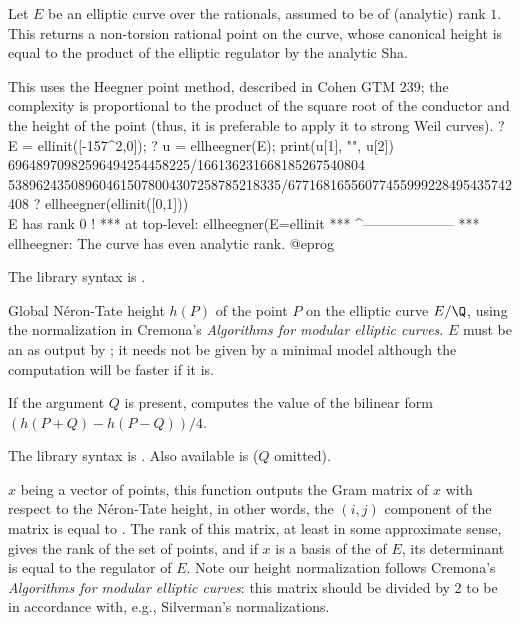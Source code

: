 \label{se:ellheegner}
Let $E$ be an elliptic curve over the rationals, assumed to be of
(analytic) rank $1$. This returns a non-torsion rational point on the curve,
whose canonical height is equal to the product of the elliptic regulator by the
analytic Sha.

This uses the Heegner point method, described in Cohen GTM 239; the complexity
is proportional to the product of the square root of the conductor and the
height of the point (thus, it is preferable to apply it to strong Weil curves).
\bprog
? E = ellinit([-157^2,0]);
? u = ellheegner(E); print(u[1], "\n", u[2])
69648970982596494254458225/166136231668185267540804
538962435089604615078004307258785218335/67716816556077455999228495435742408
? ellheegner(ellinit([0,1]))         \\ E has rank 0 !
 ***   at top-level: ellheegner(E=ellinit
 ***                 ^--------------------
 *** ellheegner: The curve has even analytic rank.
@eprog

The library syntax is .

\label{se:ellheight}
Global N\'eron-Tate height $h(P)$ of the point $P$ on the elliptic curve
$E/\Q$, using the normalization in Cremona's \emph{Algorithms for modular
elliptic curves}. $E$ must be an  as output by ; it
needs not be given by a minimal model although the computation will be faster
if it is.

If the argument $Q$ is present, computes the value of the bilinear
form $(h(P+Q)-h(P-Q)) / 4$.

The library syntax is .
Also available is 
($Q$ omitted).

\label{se:ellheightmatrix}
$x$ being a vector of points, this
function outputs the Gram matrix of $x$ with respect to the N\'eron-Tate
height, in other words, the $(i,j)$ component of the matrix is equal to
. The rank of this matrix, at least in some
approximate sense, gives the rank of the set of points, and if $x$ is a
basis of the  of $E$, its determinant is equal to
the regulator of $E$. Note our height normalization follows Cremona's
\emph{Algorithms for modular elliptic curves}: this matrix should be divided
by 2 to be in accordance with, e.g., Silverman's normalizations.

